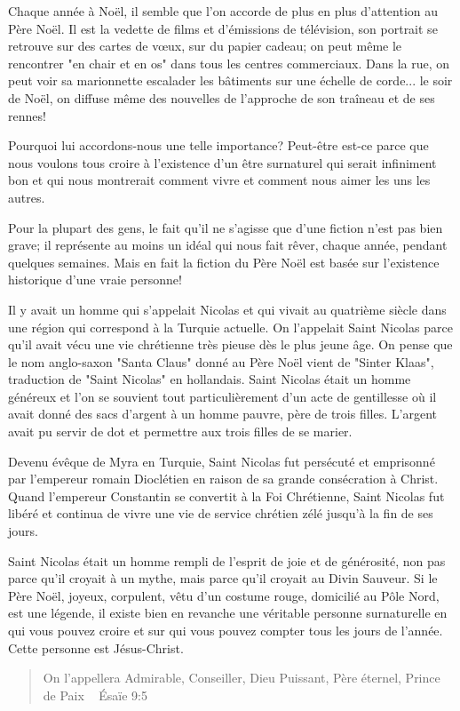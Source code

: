 
Chaque année à Noël, il semble que l'on accorde de plus en plus d'attention au Père Noël. Il est la vedette de films et d'émissions de télévision, son portrait se retrouve sur des cartes de vœux, sur du papier cadeau; on peut même le rencontrer "en chair et en os" dans tous les centres commerciaux. Dans la rue, on peut voir sa marionnette escalader les bâtiments sur une échelle de corde... le soir de Noël, on diffuse même des nouvelles de l'approche de son traîneau et de ses rennes!

Pourquoi lui accordons-nous une telle importance? Peut-être est-ce parce que nous voulons tous croire à l'existence d'un être surnaturel qui serait infiniment bon et qui nous montrerait comment vivre et comment nous aimer les uns les autres.

Pour la plupart des gens, le fait qu'il ne s'agisse que d'une fiction n'est pas bien grave; il représente au moins un idéal qui nous fait rêver, chaque année, pendant quelques semaines. Mais en fait la fiction du Père Noël est basée sur l'existence historique d'une vraie personne!

Il y avait un homme qui s'appelait Nicolas et qui vivait au quatrième siècle dans une région qui correspond à la Turquie actuelle. On l'appelait Saint Nicolas parce qu'il avait vécu une vie chrétienne très pieuse dès le plus jeune âge. On pense que le nom anglo-saxon "Santa Claus" donné au Père Noël vient de "Sinter Klaas", traduction de "Saint Nicolas" en hollandais. Saint Nicolas était un homme généreux et l'on se souvient tout particulièrement d'un acte de gentillesse où il avait donné des sacs d'argent à un homme pauvre, père de trois filles. L'argent avait pu servir de dot et permettre aux trois filles de se marier.

Devenu évêque de Myra en Turquie, Saint Nicolas fut persécuté et emprisonné par l'empereur romain Dioclétien en raison de sa grande consécration à Christ. Quand l'empereur Constantin se convertit à la Foi Chrétienne, Saint Nicolas fut libéré et continua de vivre une vie de service chrétien zélé jusqu'à la fin de ses jours.

Saint Nicolas était un homme rempli de l'esprit de joie et de générosité, non pas parce qu'il croyait à un mythe, mais parce qu'il croyait au Divin Sauveur. Si le Père Noël, joyeux, corpulent, vêtu d'un costume rouge, domicilié au Pôle Nord, est une légende, il existe bien en revanche une véritable personne surnaturelle en qui vous pouvez croire et sur qui vous pouvez compter tous les jours de l'année. Cette personne est Jésus-Christ.

\begin{quote}
On l'appellera Admirable, Conseiller, Dieu Puissant, Père éternel, Prince de Paix ~ Ésaïe 9:5
\end{quote}
